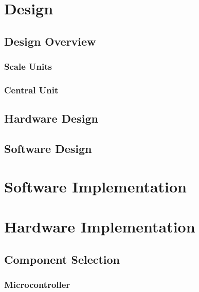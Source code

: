 \documentclass{l3proj}
\begin{document}
\chapter{Design}
\label{chap:design}

\section{Design Overview}



\subsection{Scale Units}
\label{sec:scale}


\subsection{Central Unit}
\label{sec:central}


\section{Hardware Design}



\section{Software Design}

\chapter{Software Implementation}
\label{chap:software impl}

\chapter{Hardware Implementation}


\section{Component Selection}

\subsection{Microcontroller}

\end{document}
